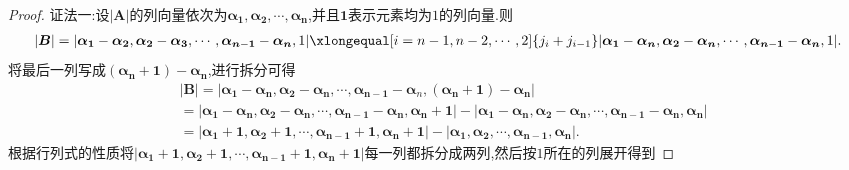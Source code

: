 \documentclass[lang=cn,newtx,10pt,scheme=chinese]{elegantbook}
\begin{document}
\begin{proof}
{\color{blue}证法一:}设\(|\boldsymbol{A}|\)的列向量依次为\(\boldsymbol{\alpha }_{\mathbf{1}},\boldsymbol{\alpha }_{\mathbf{2}},\cdots ,\boldsymbol{\alpha }_{\boldsymbol{n}}\),并且\(\mathbf{1}\)表示元素均为\(1\)的列向量.则
\begin{align*}
|\boldsymbol{B}|=|\boldsymbol{\alpha }_{\mathbf{1}}-\boldsymbol{\alpha }_{\mathbf{2}},\boldsymbol{\alpha }_{\mathbf{2}}-\boldsymbol{\alpha }_{\mathbf{3}},\cdots ,\boldsymbol{\alpha }_{\boldsymbol{n}-\mathbf{1}}-\boldsymbol{\alpha }_{\boldsymbol{n}},1|\xlongequal[i=n-1,n-2,\cdots ,2]{j_i+j_{i-1}}|\boldsymbol{\alpha }_{\mathbf{1}}-\boldsymbol{\alpha }_{\boldsymbol{n}},\boldsymbol{\alpha }_{\mathbf{2}}-\boldsymbol{\alpha }_{\boldsymbol{n}},\cdots ,\boldsymbol{\alpha }_{\boldsymbol{n}-\mathbf{1}}-\boldsymbol{\alpha }_{\boldsymbol{n}},1|.        
\end{align*}
将最后一列写成\((\boldsymbol{\alpha}_{\boldsymbol{n}} + \mathbf{1}) - \boldsymbol{\alpha}_{\boldsymbol{n}}\),进行拆分可得
\begin{align*}
&|\boldsymbol{B}| = |\boldsymbol{\alpha}_{\boldsymbol{1}} - \boldsymbol{\alpha}_{\boldsymbol{n}},\boldsymbol{\alpha}_{\boldsymbol{2}} - \boldsymbol{\alpha}_{\boldsymbol{n}},\cdots,\boldsymbol{\alpha}_{\boldsymbol{n - 1}} - \boldsymbol{\alpha}_n,(\boldsymbol{\alpha}_{\boldsymbol{n}} + \mathbf{1}) - \boldsymbol{\alpha}_{\boldsymbol{n}}|
\\
&= |\boldsymbol{\alpha}_{\boldsymbol{1}} - \boldsymbol{\alpha}_{\boldsymbol{n}},\boldsymbol{\alpha}_{\boldsymbol{2}} - \boldsymbol{\alpha}_{\boldsymbol{n}},\cdots,\boldsymbol{\alpha}_{\boldsymbol{n - 1}} - \boldsymbol{\alpha}_{\boldsymbol{n}},\boldsymbol{\alpha}_{\boldsymbol{n}} + \mathbf{1}| - |\boldsymbol{\alpha}_{\boldsymbol{1}} - \boldsymbol{\alpha}_{\boldsymbol{n}},\boldsymbol{\alpha}_{\boldsymbol{2}} - \boldsymbol{\alpha}_{\boldsymbol{n}},\cdots,\boldsymbol{\alpha}_{\boldsymbol{n - 1}} - \boldsymbol{\alpha}_{\boldsymbol{n}},\boldsymbol{\alpha}_{\boldsymbol{n}}|
\\
&= |\boldsymbol{\alpha}_{\boldsymbol{1}} + \mathbf{1},\boldsymbol{\alpha}_{\boldsymbol{2}} + \mathbf{1},\cdots,\boldsymbol{\alpha}_{\boldsymbol{n - 1}} + \mathbf{1},\boldsymbol{\alpha}_{\boldsymbol{n}} + \mathbf{1}| - |\boldsymbol{\alpha}_{\boldsymbol{1}},\boldsymbol{\alpha}_{\boldsymbol{2}},\cdots,\boldsymbol{\alpha}_{\boldsymbol{n-1}},\boldsymbol{\alpha}_{\boldsymbol{n}}|.
\end{align*}
根据行列式的性质将\(|\boldsymbol{\alpha}_{\boldsymbol{1}} + \mathbf{1},\boldsymbol{\alpha}_{\boldsymbol{2}} + \mathbf{1},\cdots,\boldsymbol{\alpha}_{\boldsymbol{n-1}} + \mathbf{1},\boldsymbol{\alpha}_{\boldsymbol{n}} + \mathbf{1}|\)每一列都拆分成两列,然后按\(1\)所在的列展开得到

\end{proof}
\end{document}
